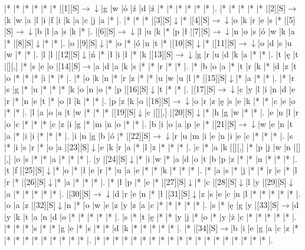 \documentclass[11pt]{article}
\newcommand\drarr{$\rightarrow \!\!\!\!\! \downarrow$}
\newcommand\rarr{$\rightarrow$}
\newcommand\darr{$\downarrow$}
\begin{document}
\noindent\begin{Puzzle}{18}{28}|*	|*	|*	|*	|*	|*	|[1][S]\drarr	|g	|w	|ó	|ź	|d	|ź	|*	|*	|*	|*	|*	|*	|.
|*	|*	|*	|*	|*	|[2][S]\rarr	|k	|w	|a	|l	|i	|f	|i	|k	|a	|c	|j	|a	|*	|.
|*	|*	|*	|[3][S]\darr	|*	|[4][S]\drarr	|o	|k	|r	|e	|s	|*	|[5][S]\drarr	|b	|l	|a	|s	|k	|*	|.
|[6][S]\drarr	|l	|u	|k	|*	|p	|ł	|[7][S]\drarr	|n	|o	|s	|ó	|w	|k	|a	|*	|[8][S]\darr	|*	|*	|.
|o	|[9][S]\darr	|*	|o	|*	|ó	|n	|t	|*	|[10][S]\darr	|*	|[11][S]\drarr	|o	|d	|s	|u	|w	|*	|*	|.
|l	|l	|[12][S]\darr	|ń	|*	|ł	|i	|ł	|*	|k	|[13][S]\drarr	|g	|r	|u	|d	|k	|a	|*	|*	|.
|t	|ę	|t	|[][,]{ }	|*	|s	|e	|o	|[14][S]\rarr	|a	|d	|a	|k	|s	|*	|*	|r	|*	|*	|.
|*	|b	|o	|a	|*	|t	|r	|k	|*	|d	|z	|t	|o	|*	|*	|*	|i	|*	|*	|.
|*	|o	|k	|n	|*	|r	|z	|*	|*	|u	|w	|u	|l	|*	|[15][S]\darr	|*	|a	|*	|*	|.
|*	|r	|s	|g	|*	|u	|*	|*	|*	|k	|o	|n	|o	|*	|p	|[16][S]\darr	|t	|*	|*	|.
|[17][S]\drarr	|c	|y	|l	|i	|n	|d	|e	|r	|*	|n	|e	|t	|*	|o	|l	|k	|*	|*	|.
|p	|z	|k	|o	|[18][S]\drarr	|o	|r	|z	|ę	|s	|e	|k	|*	|*	|c	|e	|o	|*	|*	|.
|l	|a	|o	|a	|t	|w	|*	|*	|*	|[19][S]\darr	|c	|[][,]{ }	|[20][S]\darr	|*	|h	|g	|w	|*	|*	|.
|e	|n	|l	|r	|o	|c	|*	|*	|*	|c	|z	|i	|g	|*	|m	|n	|o	|*	|*	|.
|b	|i	|o	|a	|p	|e	|*	|[21][S]\drarr	|w	|e	|n	|t	|a	|*	|i	|i	|*	|*	|*	|.
|i	|n	|g	|b	|ó	|*	|[22][S]\drarr	|r	|u	|m	|i	|e	|n	|i	|e	|c	|*	|*	|*	|.
|s	|*	|i	|s	|r	|*	|o	|a	|[23][S]\darr	|e	|k	|r	|a	|*	|l	|z	|*	|*	|*	|.
|c	|*	|a	|k	|[][,]{ }	|*	|p	|j	|w	|n	|[][,]{ }	|o	|s	|*	|*	|a	|*	|*	|*	|.
|y	|[24][S]\darr	|*	|i	|w	|*	|a	|d	|o	|t	|b	|p	|z	|*	|*	|n	|*	|*	|*	|.
|t	|f	|[25][S]\darr	|*	|o	|*	|ł	|e	|r	|*	|u	|a	|e	|*	|*	|k	|*	|*	|*	|.
|*	|a	|s	|*	|j	|*	|*	|r	|e	|*	|l	|r	|*	|[26][S]\darr	|*	|a	|*	|*	|*	|.
|*	|ł	|p	|*	|e	|*	|[27][S]\darr	|*	|c	|[28][S]\darr	|l	|y	|[29][S]\darr	|a	|*	|*	|*	|*	|*	|.
|[30][S]\drarr	|d	|r	|e	|n	|*	|ł	|[31][S]\darr	|z	|s	|e	|c	|n	|l	|*	|*	|*	|*	|*	|.
|o	|a	|z	|[32][S]\darr	|n	|*	|o	|w	|e	|z	|y	|z	|a	|c	|*	|*	|*	|*	|*	|.
|s	|*	|ę	|g	|y	|[33][S]\rarr	|d	|y	|k	|t	|a	|n	|d	|o	|*	|*	|*	|*	|*	|.
|s	|*	|t	|ę	|*	|*	|y	|j	|*	|o	|*	|y	|ż	|c	|*	|*	|*	|*	|*	|.
|*	|*	|*	|s	|*	|*	|g	|e	|*	|s	|*	|*	|d	|k	|*	|*	|*	|*	|*	|.
|*	|[34][S]\rarr	|b	|i	|e	|g	|a	|c	|z	|*	|*	|*	|*	|*	|*	|*	|*	|*	|*	|.
|*	|*	|*	|*	|*	|*	|*	|*	|*	|*	|*	|*	|*	|*	|*	|*	|*	|*	|*	|.\end{Puzzle}

\newpage
\end{document}
